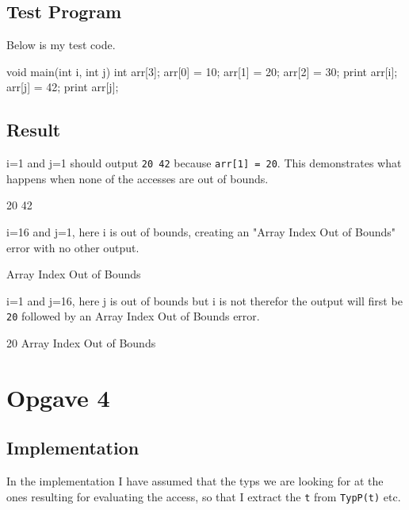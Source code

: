 \subsection{Test Program}
Below is my test code.
\begin{ccode}
void main(int i, int j) {
    int arr[3];
    arr[0] = 10;
    arr[1] = 20;
    arr[2] = 30;
    print arr[i];
    arr[j] = 42;
    print arr[j];
}
\end{ccode}
\subsection{Result}
i=1 and j=1 should output \texttt{20 42} because \texttt{arr[1] = 20}. This
demonstrates what happens when none of the accesses are out of bounds.
\begin{bashcode}
20 42 
\end{bashcode}
i=16 and j=1, here i is out of bounds, creating an "Array Index Out of Bounds"
error with no other output.
\begin{bashcode}
Array Index Out of Bounds
\end{bashcode}
i=1 and j=16, here j is out of bounds but i is not therefor the output will
first be \texttt{20} followed by an Array Index Out of Bounds error.
\begin{bashcode}
20 Array Index Out of Bounds
\end{bashcode}

\section{Opgave 4}
\subsection{Implementation}
In the implementation I have assumed that the typs we are looking for at the
ones resulting for evaluating the access, so that I extract the \texttt{t} from
\texttt{TypP(t)} etc.

